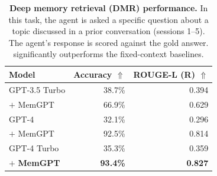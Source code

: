 




\begin{table}[t!]
\caption{
\textbf{Deep memory retrieval (DMR) performance.}
In this task, the agent is asked a specific question about a topic discussed in a prior conversation (sessions 1--5).
The agent's response is scored against the gold answer.
\ours significantly outperforms the fixed-context baselines.
}
\label{table:deep-memory-task}

\begin{center}
\begin{tabular}{lrr}
\toprule
\bf Model & \textbf{Accuracy} $\Uparrow$ & \bf ROUGE-L (R) $\Uparrow$ \\
\midrule

GPT-3.5 Turbo & 38.7\% & 0.394  \\
$+$ MemGPT & 66.9\% & 0.629 \\


GPT-4 & 32.1\% & 0.296 \\

$+$ MemGPT & 92.5\% & 0.814  \\


GPT-4 Turbo & 35.3\% & 0.359  \\

$+$ \textbf{MemGPT} & \textbf{93.4\%} & \textbf{0.827}  \\

\bottomrule
\end{tabular}
\end{center}

\end{table}

